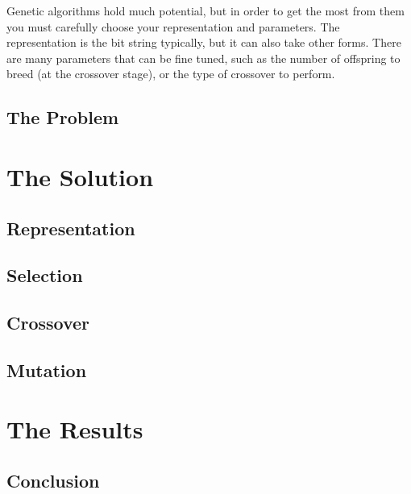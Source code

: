 \documentclass[]{report}
\begin{document}
Genetic algorithms hold much potential, but in order to get the most from them you must carefully choose your representation and parameters. The representation is the bit string typically, but it can also take other forms. There are many parameters that can be fine tuned, such as the number of offspring to breed (at the crossover stage), or the type of crossover to perform.

\section{The Problem}

\chapter{The Solution}

\section{Representation}

\section{Selection}

\section{Crossover}

\section{Mutation}

\chapter{The Results}

\section{Conclusion}


\end{document}
